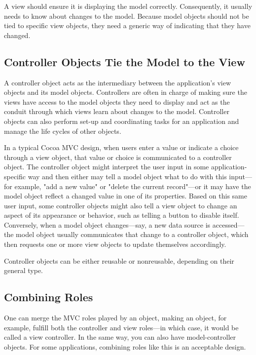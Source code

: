 A view should ensure it is displaying the model correctly. Consequently, it
usually needs to know about changes to the model. Because model objects should
not be tied to specific view objects, they need a generic way of indicating that
they have changed.

\subsection{Controller Objects Tie the Model to the View}

A controller object acts as the intermediary between the application's view
objects and its model objects. Controllers are often in charge of making sure
the views have access to the model objects they need to display and act as the
conduit through which views learn about changes to the model. Controller objects
can also perform set-up and coordinating tasks for an application and manage the
life cycles of other objects.

In a typical Cocoa MVC design, when users enter a value or indicate a choice
through a view object, that value or choice is communicated to a controller
object. The controller object might interpret the user input in some
application-specific way and then either may tell a model object what to do with
this input—for example, "add a new value" or "delete the current record"—or it
may have the model object reflect a changed value in one of its properties.
Based on this same user input, some controller objects might also tell a view
object to change an aspect of its appearance or behavior, such as telling a
button to disable itself. Conversely, when a model object changes—say, a new
data source is accessed—the model object usually communicates that change to a
controller object, which then requests one or more view objects to update
themselves accordingly.

Controller objects can be either reusable or nonreusable, depending on their
general type.

\subsection{Combining Roles}

One can merge the MVC roles played by an object, making an object, for example,
fulfill both the controller and view roles—in which case, it would be called a
view controller. In the same way, you can also have model-controller objects.
For some applications, combining roles like this is an acceptable design.

